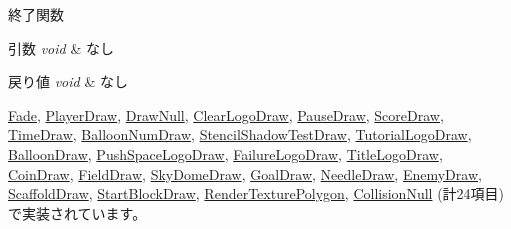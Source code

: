 終了関数 


\begin{DoxyParams}{引数}
{\em void} & なし \\
\hline
\end{DoxyParams}

\begin{DoxyRetVals}{戻り値}
{\em void} & なし \\
\hline
\end{DoxyRetVals}


\mbox{\hyperlink{class_fade_ae77d06811869d3c8162a42c3e0e14f7f}{Fade}}, \mbox{\hyperlink{class_player_draw_a917b2947914287f23d87ca75cd68f553}{Player\+Draw}}, \mbox{\hyperlink{class_draw_null_a6e81d63efab7333e8d0e8af99362a4d9}{Draw\+Null}}, \mbox{\hyperlink{class_clear_logo_draw_aa73db5b701e644f8e552ddb254a0a9aa}{Clear\+Logo\+Draw}}, \mbox{\hyperlink{class_pause_draw_a2723bac62bfe180cc8af3c68948db376}{Pause\+Draw}}, \mbox{\hyperlink{class_score_draw_aad744f8a7a1202e6ba8117c660f297ee}{Score\+Draw}}, \mbox{\hyperlink{class_time_draw_abcfea17acdc56d251e680e926da001fc}{Time\+Draw}}, \mbox{\hyperlink{class_balloon_num_draw_a178dd82afc9c554729b66ccfe65ad212}{Balloon\+Num\+Draw}}, \mbox{\hyperlink{class_stencil_shadow_test_draw_ad0672bf4ecfc8091cf54ed6f2c76b618}{Stencil\+Shadow\+Test\+Draw}}, \mbox{\hyperlink{class_tutorial_logo_draw_a949fb70954e3df28f87b8ed5c61bf8f1}{Tutorial\+Logo\+Draw}}, \mbox{\hyperlink{class_balloon_draw_a9c38865af6eb74b163fcdd6204c42e3e}{Balloon\+Draw}}, \mbox{\hyperlink{class_push_space_logo_draw_a79021c1df43968d6008de74126d53fba}{Push\+Space\+Logo\+Draw}}, \mbox{\hyperlink{class_failure_logo_draw_a97646253380b54f37565650e211f33cd}{Failure\+Logo\+Draw}}, \mbox{\hyperlink{class_title_logo_draw_a07bbf9e8de5c7b9ee028408496c13c50}{Title\+Logo\+Draw}}, \mbox{\hyperlink{class_coin_draw_a6484c22a5598e298f18e7cd6083cd551}{Coin\+Draw}}, \mbox{\hyperlink{class_field_draw_a89a78212c141714d9e39e25e663aaeff}{Field\+Draw}}, \mbox{\hyperlink{class_sky_dome_draw_aee1c6b102a97033073b2559b8c2c328b}{Sky\+Dome\+Draw}}, \mbox{\hyperlink{class_goal_draw_a01318a0606848a3ca8ca7b7acbf4df24}{Goal\+Draw}}, \mbox{\hyperlink{class_needle_draw_ad831a9aba09ad3932832a23301bd6143}{Needle\+Draw}}, \mbox{\hyperlink{class_enemy_draw_a2861dc0623b0be7726bc69a6a469190e}{Enemy\+Draw}}, \mbox{\hyperlink{class_scaffold_draw_a5a377eb53b13402bf788d13c9b6492b2}{Scaffold\+Draw}}, \mbox{\hyperlink{class_start_block_draw_aee2e80725c15a65d085a7effb2a556f4}{Start\+Block\+Draw}}, \mbox{\hyperlink{class_render_texture_polygon_a3ff2fc37bb953074a5ab8a0dde7aaa1c}{Render\+Texture\+Polygon}}, \mbox{\hyperlink{class_collision_null_aafac3fdab43845465fd1e0198c423ccf}{Collision\+Null}} (計24項目)で実装されています。

